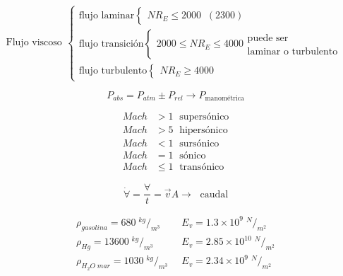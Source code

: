 \[
    \begin{array}{c}
         \text{Flujo viscoso}
    \end{array}
    \left\{ 
        \begin{array}{l}
             \text{flujo laminar} 
                \left\{
                    \begin{array}{l}
                        NR_{E} \leq 2000 \;\; (2300) 
                    \end{array}
                 \right.\\ 
             \text{flujo transición} 
                \left\{
                    \begin{array}{l}
                         2000 \leq NR_{E} \leq 4000
                            \begin{array}{l}
                                \text{puede ser}\\
                                \text{laminar o turbulento}
                            \end{array}
                    \end{array}
                \right.\\ 
             \text{flujo turbulento} 
                \left\{
                    \begin{array}{l}
                         NR_{E} \geq 4000
                    \end{array}
                \right.
        \end{array}
    \right.    
\]

\[
    P_{abs} = P_{atm} \pm P_{rel} \to P_{ \text{manométrica}}
\]

\[
    \begin{split}
        Mach & > 1 \; \text{ supersónico} \\
        Mach & > 5 \; \text{ hipersónico} \\
        Mach & < 1 \; \text{ sursónico} \\
        Mach & = 1 \; \text{ sónico} \\
        Mach & \leq 1 \; \text{ transónico}
    \end{split}
\]

\[
    \dot{ \forall } = \frac{ \forall }{ t } = \Vec{ v } A \to \; \text{ caudal}
\]

\[
    \begin{split}
        \rho_{ gasolina } = 680 {\;}^{ kg }/_{ m^{3} } \;\; & E_{v} = 1.3 \times 10^{9} {\;}^{ N }/_{ m^{2} } \\
        \rho_{ Hg } = 13600 {\;}^{ kg }/_{ m^{3} } \;\;& E_{v} = 2.85 \times 10^{10} {\;}^{ N }/_{ m^{2} } \\
        \rho_{H_{2}O \; mar} = 1030 {\;}^{ kg }/_{ m^{3} } \;\;& E_{v} = 2.34 \times 10^{9} {\;}^{ N }/_{ m^{2} } \\
    \end{split}
\]

